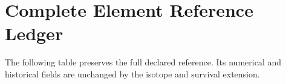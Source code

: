 \section{Complete Element Reference Ledger}\label{manual2:app:element-ledger}
The following table preserves the full declared reference. Its numerical and historical fields are unchanged by the isotope and survival extension.

